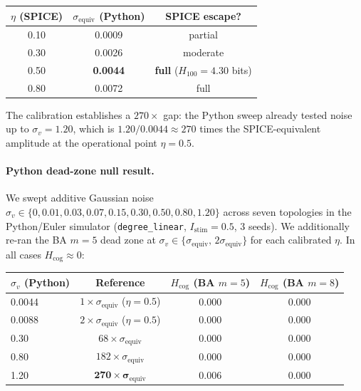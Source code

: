 \documentclass[11pt,a4paper]{article}
\begin{document}
\begin{center}
\begin{tabular}{ccc}
\hline
$\eta$ (SPICE) & $\sigma_{\mathrm{equiv}}$ (Python) & SPICE escape? \\
\hline
0.10 & 0.0009 & partial \\
0.30 & 0.0026 & moderate \\
0.50 & \textbf{0.0044} & \textbf{full} ($H_{100} = 4.30$ bits) \\
0.80 & 0.0072 & full \\
\hline
\end{tabular}
\end{center}

The calibration establishes a $270\times$ gap: the Python sweep already tested noise up to $\sigma_v = 1.20$, which is $1.20 / 0.0044 \approx 270$ times the SPICE-equivalent amplitude at the operational point $\eta = 0.5$.

\paragraph{Python dead-zone null result.}
We swept additive Gaussian noise $\sigma_v \in \{0, 0.01, 0.03, 0.07, 0.15, 0.30, 0.50, 0.80, 1.20\}$ across seven topologies in the Python/Euler simulator (\texttt{degree\_linear}, $I_{\mathrm{stim}}=0.5$, 3 seeds). We additionally re-ran the BA $m=5$ dead zone at $\sigma_v \in \{\sigma_{\mathrm{equiv}},\, 2\sigma_{\mathrm{equiv}}\}$ for each calibrated $\eta$. In all cases $H_{\mathrm{cog}} \approx 0$:

\begin{center}
\begin{tabular}{lccc}
\hline
$\sigma_v$ (Python) & Reference & $H_{\mathrm{cog}}$ (BA $m=5$) & $H_{\mathrm{cog}}$ (BA $m=8$) \\
\hline
0.0044 & $1\times\sigma_{\mathrm{equiv}}$ ($\eta=0.5$) & 0.000 & 0.000 \\
0.0088 & $2\times\sigma_{\mathrm{equiv}}$ ($\eta=0.5$) & 0.000 & 0.000 \\
0.30   & $68\times\sigma_{\mathrm{equiv}}$             & 0.000 & 0.000 \\
0.80   & $182\times\sigma_{\mathrm{equiv}}$            & 0.000 & 0.000 \\
1.20   & $\mathbf{270\times\sigma_{\mathrm{equiv}}}$  & 0.006 & 0.000 \\
\hline
\end{tabular}
\end{center}
\end{document}
